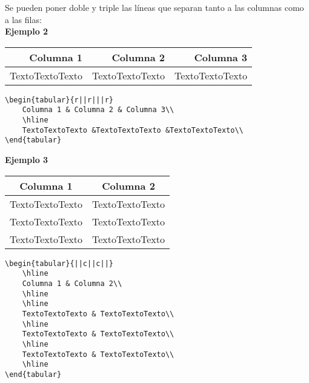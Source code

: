 Se pueden poner doble y triple las líneas que separan tanto a las columnas como a las filas:\\

\textbf{Ejemplo 2}

\begin{center}
	\begin{tabular}{r||r|||r}			
		Columna 1 & Columna 2 & Columna 3\\	
		\hline			
		TextoTextoTexto & TextoTextoTexto & TextoTextoTexto\\					
	\end{tabular}
\end{center}	


\begin{myquote}
	\begin{lstlisting}
\begin{tabular}{r||r|||r}			
	Columna 1 & Columna 2 & Columna 3\\	
	\hline			
	TextoTextoTexto &TextoTextoTexto &TextoTextoTexto\\
\end{tabular}			
	\end{lstlisting}			
\end{myquote}


\textbf{Ejemplo 3}

\begin{center}
	\begin{tabular}{||c||c||}	
		\hline		
		Columna 1 & Columna 2\\	
		\hline
		\hline			
		TextoTextoTexto & TextoTextoTexto\\	
		\hline			
		TextoTextoTexto & TextoTextoTexto\\	
		\hline			
		TextoTextoTexto & TextoTextoTexto\\	
		\hline				
	\end{tabular}
\end{center}	


\begin{myquote}
	\begin{lstlisting}
\begin{tabular}{||c||c||}	
	\hline		
	Columna 1 & Columna 2\\	
	\hline	
	\hline		
	TextoTextoTexto & TextoTextoTexto\\	
	\hline			
	TextoTextoTexto & TextoTextoTexto\\	
	\hline			
	TextoTextoTexto & TextoTextoTexto\\	
	\hline				
\end{tabular}			
	\end{lstlisting}			
\end{myquote}


